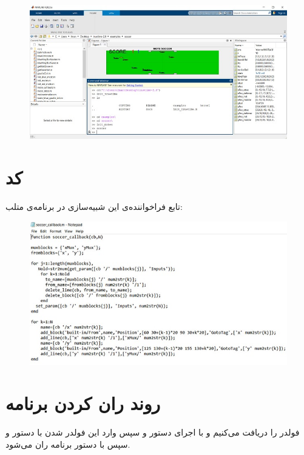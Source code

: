 \begin{figure}[H]
	\centering
	\includegraphics{11.jpg}
	\label{fig:label4}
\end{figure}

\newpage

\section*{کد }

تابع فراخواننده‌ی این شبیه‌سازی در برنامه‌ی متلب:

\begin{figure}[H]
	\centering
	\includegraphics{16.jpg}
	\label{fig:label4}
\end{figure}

\newpage

\section*{روند ران کردن برنامه}

فولدر
را دریافت می‌کنیم و با اجرای دستور
و سپس وارد این فولدر شدن با دستور
و سپس با دستور
برنامه ران می‌شود.

